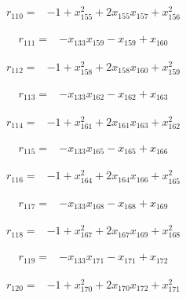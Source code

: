 \documentclass[10pt,letterpaper]{article}
\theoremstyle{remark}\newtheorem{remark}[theorem]{Remark}
\begin{document}
\begin{align*}
r_{110}={}&-1+x_{155}^{2}+2x_{155}x_{157}+x_{156}^{2}
\end{align*}

\begin{align*}
r_{111}={}&-x_{133}x_{159}-x_{159}+x_{160}
\end{align*}

\begin{align*}
r_{112}={}&-1+x_{158}^{2}+2x_{158}x_{160}+x_{159}^{2}
\end{align*}

\begin{align*}
r_{113}={}&-x_{133}x_{162}-x_{162}+x_{163}
\end{align*}

\begin{align*}
r_{114}={}&-1+x_{161}^{2}+2x_{161}x_{163}+x_{162}^{2}
\end{align*}

\begin{align*}
r_{115}={}&-x_{133}x_{165}-x_{165}+x_{166}
\end{align*}

\begin{align*}
r_{116}={}&-1+x_{164}^{2}+2x_{164}x_{166}+x_{165}^{2}
\end{align*}

\begin{align*}
r_{117}={}&-x_{133}x_{168}-x_{168}+x_{169}
\end{align*}

\begin{align*}
r_{118}={}&-1+x_{167}^{2}+2x_{167}x_{169}+x_{168}^{2}
\end{align*}

\begin{align*}
r_{119}={}&-x_{133}x_{171}-x_{171}+x_{172}
\end{align*}

\begin{align*}
r_{120}={}&-1+x_{170}^{2}+2x_{170}x_{172}+x_{171}^{2}
\end{align*}
\end{document}

